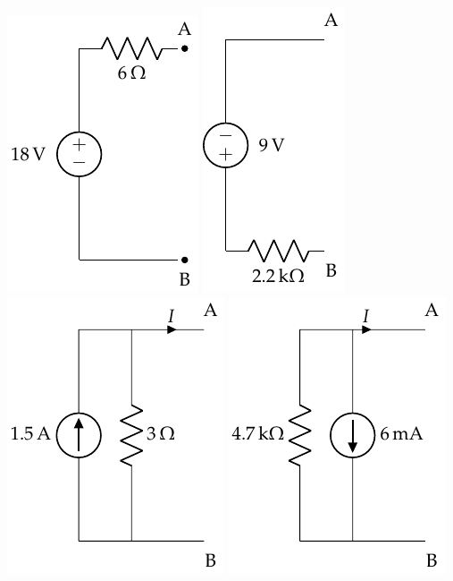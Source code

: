 \documentclass[12pt]{article}
\begin{document}
\includegraphics{figs/Conversion_Fuentes.pdf}
\includegraphics{figs/Conversion_Fuentes_2.pdf}
\includegraphics{figs/Conversion_Fuentes_3.pdf}
\includegraphics{figs/Conversion_Fuentes_4.pdf}
\end{document}
